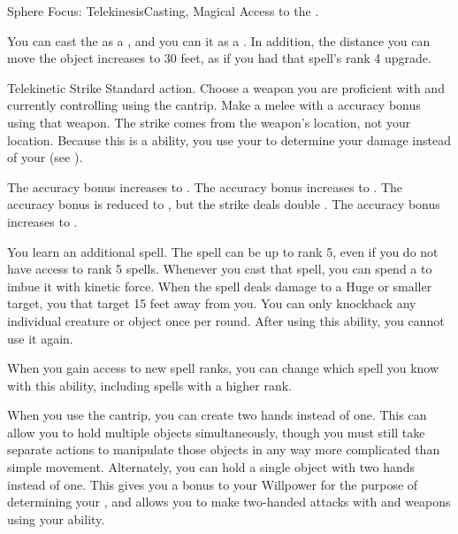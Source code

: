   \begin{magicalfeat}{Sphere Focus: Telekinesis}{Casting, Magical}
    \featpre Access to the  .

     You can cast the   as a , and you can  it as a .
    In addition, the distance you can move the object increases to 30 feet, as if you had that spell's rank 4 upgrade.

    \begin{magicalactiveability}{Telekinetic Strike}
      \abilityusagetime Standard action.
      \rankline
      Choose a weapon you are proficient with and currently controlling using the  cantrip.
      Make a melee  with a  accuracy bonus using that weapon.
      The strike comes from the weapon's location, not your location.
      Because this is a \magical ability, you use your  to determine your damage instead of your  (see ).

      \rankline
       The accuracy bonus increases to .
       The accuracy bonus increases to .
       The accuracy bonus is reduced to , but the strike deals double .
       The accuracy bonus increases to .
    \end{magicalactiveability}

     You learn an additional spell.
    The spell can be up to rank 5, even if you do not have access to rank 5 spells.
    Whenever you cast that spell, you can spend a  to  imbue it with kinetic force.
    When the spell deals damage to a Huge or smaller target, you  that target 15 feet away from you.
    You can only knockback any individual creature or object once per round.
    After using this ability, you  cannot use it again.

    When you gain access to new spell ranks, you can change which spell you know with this ability, including spells with a higher rank.

     When you use the  cantrip, you can create two hands instead of one.
    This can allow you to hold multiple objects simultaneously, though you must still take separate actions to manipulate those objects in any way more complicated than simple movement.
    Alternately, you can hold a single object with two hands instead of one.
    This gives you a  bonus to your Willpower for the purpose of determining your , and allows you to make two-handed attacks with  and  weapons using your  ability.
  \end{magicalfeat}

